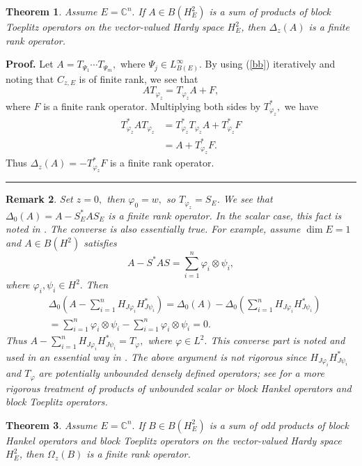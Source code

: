 \documentclass{article}%
\newtheorem{theorem}{Theorem}[section]
\newtheorem{remark}[theorem]{Remark}
\newenvironment{proof}[1][Proof]{\noindent\textbf{#1.} }{\ \rule{0.5em}{0.5em}}
\begin{document}
\begin{theorem}
\label{thm1}Assume $E=\mathbb{C}^{n}.$ If $A\in B(H_{E}^{2})$ is a sum of
products of block Toeplitz operators on the vector-valued Hardy space
$H_{E}^{2}$, then $\Delta_{z}(A)$ is a finite rank operator.
\end{theorem}

\begin{proof}
Let $A=T_{\Psi_{1}}\cdots T_{\Psi_{m}},$ where $\Psi_{j}\in L_{B(E)}^{\infty
}.$ By using (\ref{bb}) iteratively and noting that $C_{z,E}$ is of finite
rank, we see that
\[
AT_{\varphi_{z}}=T_{\varphi_{z}}A+F,
\]
where $F$ is a finite rank operator. Multiplying both sides by $T_{\varphi
_{z}}^{\ast},$ we have
\begin{align*}
T_{\varphi_{z}}^{\ast}AT_{\varphi_{z}}  &  =T_{\varphi_{z}}^{\ast}%
T_{\varphi_{z}}A+T_{\varphi_{z}}^{\ast}F\\
&  =A+T_{\varphi_{z}}^{\ast}F.
\end{align*}
Thus $\Delta_{z}(A)=-T_{\varphi_{z}}^{\ast}F$ is a finite rank operator.
\end{proof}

\begin{remark}
\label{rm1}Set $z=0,$ then $\varphi_{0}=w,$ so $T_{\varphi_{z}}=S_{E}$. We see
that $\Delta_{0}(A)=A-S_{E}^{\ast}AS_{E}$ is a finite rank operator. In the
scalar case, this fact is noted in \cite{GuJFA}. The converse is also
essentially true. For example, assume $\dim E=1$ and $A\in B(H^{2})$ satisfies%
\[
A-S^{\ast}AS=\sum_{i=1}^{n}\varphi_{i}\otimes\psi_{i},
\]
where $\varphi_{i},\psi_{i}\in H^{2}.$ Then
\begin{align*}
&  \Delta_{0}(A-\sum_{i=1}^{n}H_{J\varphi_{i}}H_{J\psi_{i}}^{\ast})=\Delta
_{0}(A)-\Delta_{0}(\sum_{i=1}^{n}H_{J\varphi_{i}}H_{J\psi_{i}}^{\ast})\\
&  =\sum_{i=1}^{n}\varphi_{i}\otimes\psi_{i}-\sum_{i=1}^{n}\varphi_{i}%
\otimes\psi_{i}=0.
\end{align*}
Thus $A-\sum_{i=1}^{n}H_{J\varphi_{i}}H_{J\psi_{i}}^{\ast}=T_{\varphi},$ where
$\varphi\in L^{2}.$ This converse part is noted and used in an essential way
in \cite{GuJFA2}. The above argument is not rigorous since $H_{J\varphi_{i}%
}H_{J\psi_{i}}^{\ast}$ and $T_{\varphi}$ are potentially unbounded densely
defined operators; see \cite{GuJFA2,GuH} for a more rigorous treatment of
products of unbounded scalar or block Hankel operators and block Toeplitz operators.
\end{remark}

\begin{theorem}
\label{thm2}Assume $E=\mathbb{C}^{n}.$ If $B\in B(H_{E}^{2})$ is a sum of odd
products of block Hankel operators and block Toeplitz operators on the
vector-valued Hardy space $H_{E}^{2}$, then $\Omega_{z}(B)$ is a finite rank operator.
\end{theorem}
\end{document}
